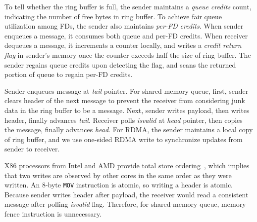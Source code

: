 To tell whether the ring buffer is full, the sender maintains a \textit{queue credits} count, indicating the number of free bytes in ring buffer.
To achieve fair queue utilization among FDs, the sender also maintains \emph{per-FD credits}.
When sender enqueues a message, it consumes both queue and per-FD credits. When receiver dequeues a message, it increments a counter locally, and writes a \textit{credit return flag} in sender's memory once the counter exceeds half the size of ring buffer. The sender regains queue credits upon detecting the flag, and scans the returned portion of queue to regain per-FD credits.

Sender enqueues message at \textit{tail} pointer. For shared memory queue, first, sender clears header of the next message to prevent the receiver from considering junk data in the ring buffer to be a message. Next, sender writes payload, then writes header, finally advances \textit{tail}. Receiver polls \textit{isvalid} at \textit{head} pointer, then copies the message, finally advances \textit{head}.
For RDMA, the sender maintains a local copy of ring buffer, and we use one-sided RDMA write to synchronize updates from sender to receiver.


X86 processors from Intel and AMD provide total store ordering~\cite{sewell2010x86,intel-manual}, which implies that two writes are observed by other cores in the same order as they were written. An 8-byte \texttt{MOV} instruction is atomic, so writing a header is atomic. Because sender writes header after payload, the receiver would read a consistent message after polling \textit{isvalid} flag. Therefore, for shared-memory queue, memory fence instruction is unnecessary.

